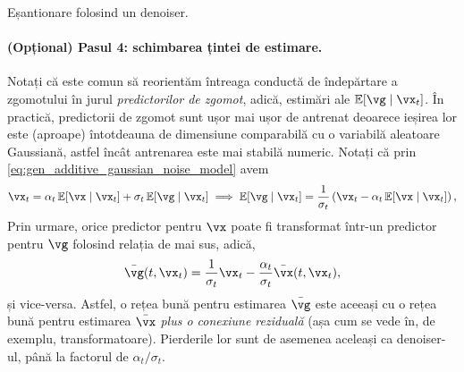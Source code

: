 \documentclass[../../book-main_ro.tex]{subfiles}
\begin{document}
\begin{algorithm}
	\caption{Eșantionare folosind un denoiser.}
	\label{alg:iterative_denoising}
	\begin{algorithmic}[1]
		 
		\EndFor
		\EndFunction
	\end{algorithmic}
\end{algorithm}

\paragraph{(Opțional) Pasul 4: schimbarea țintei de estimare.} Notați că este comun să reorientăm întreaga conductă de îndepărtare a zgomotului în jurul \textit{predictorilor de zgomot}, adică, estimări ale \(\Ex[\vg \mid \vx_{t}]\). În practică, predictorii de zgomot sunt ușor mai ușor de antrenat deoarece ieșirea lor este (aproape) întotdeauna de dimensiune comparabilă cu o variabilă aleatoare Gaussiană, astfel încât antrenarea este mai stabilă numeric. Notați că prin \eqref{eq:gen_additive_gaussian_noise_model} avem 
\begin{equation}
	\vx_{t} = \alpha_{t}\Ex[\vx \mid \vx_{t}] + \sigma_{t}\Ex[\vg \mid \vx_{t}] \implies \Ex[\vg \mid \vx_{t}] = \frac{1}{\sigma_{t}}\bp{\vx_{t} - \alpha_{t}\Ex[\vx \mid \vx_{t}]},
\end{equation}
Prin urmare, orice predictor pentru \(\vx\) poate fi transformat într-un predictor pentru \(\vg\) folosind relația de mai sus, adică,
\begin{equation}
	\bar{\vg}(t, \vx_{t}) = \frac{1}{\sigma_{t}}\vx_{t} - \frac{\alpha_{t}}{\sigma_{t}}\bar{\vx}(t, \vx_{t}),
\end{equation}
și vice-versa. Astfel, o rețea bună pentru estimarea \(\bar{\vg}\) este aceeași cu o rețea bună pentru estimarea \(\bar{\vx}\) \textit{plus o conexiune reziduală} (așa cum se vede în, de exemplu, transformatoare). Pierderile lor sunt de asemenea aceleași ca denoiser-ul, până la factorul de \(\alpha_{t}/\sigma_{t}\).
\end{document}
